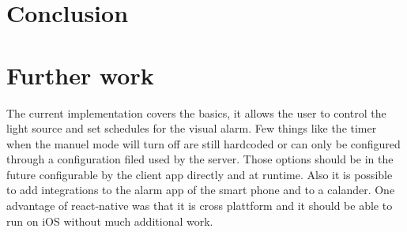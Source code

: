 \documentclass[conference]{IEEEtran}
\begin{document}
\section{Conclusion}



\section{Further work}
The current implementation covers the basics, it allows the user to control the light source and set schedules for the visual alarm.
Few things like the timer when the manuel mode will turn off are still hardcoded or can only be configured through a configuration
filed used by the server. Those options should be in the future configurable by the client app directly and at runtime. Also it
is possible to add integrations to the alarm app of the smart phone and to a calander. One advantage of react-native was that it
is cross plattform and it should be able to run on iOS without much additional work.









\end{document}
